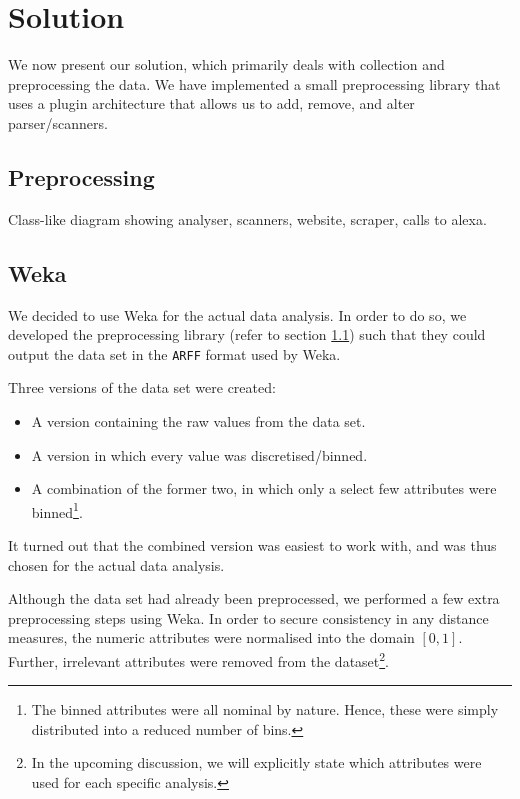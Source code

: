 \section{Solution}
\label{sec:solution}

We now present our solution, which primarily deals with collection and preprocessing the data. We have implemented a small preprocessing library that uses a plugin architecture that allows us to add, remove, and alter parser/scanners.

\subsection{Preprocessing}
\label{subsec:preprocessing}

Class-like diagram showing analyser, scanners, website, scraper, calls to alexa.

\subsection{Weka}
\label{subsec:weka}


We decided to use Weka for the actual data analysis. In order to do so, we developed the preprocessing library (refer to section \ref{subsec:preprocessing}) such that they could output the data set in the \texttt{ARFF} format used by Weka.

Three versions of the data set were created:

\begin{itemize}
\item A version containing the raw values from the data set.
\item A version in which every value was discretised/binned.
\item A combination of the former two, in which only a select few attributes were binned\footnote{The binned attributes were all nominal by nature. Hence, these were simply distributed into a reduced number of bins.}.
\end{itemize}

It turned out that the combined version was easiest to work with, and was thus chosen for the actual data analysis.

Although the data set had already been preprocessed, we performed a few extra preprocessing steps using Weka. In order to secure consistency in any distance measures, the numeric attributes were normalised into the domain $[0, 1]$. Further, irrelevant attributes were removed from the dataset\footnote{In the upcoming discussion, we will explicitly state which attributes were used for each specific analysis.}.


